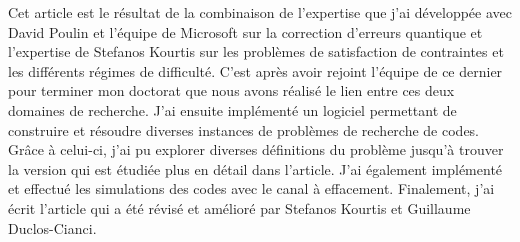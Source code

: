 Cet article est le résultat de la combinaison de l'expertise que j'ai développée avec David Poulin
et l'équipe de Microsoft sur la correction d'erreurs quantique et l'expertise de Stefanos Kourtis
sur les problèmes de satisfaction de contraintes et les différents régimes de difficulté.
C'est après avoir rejoint l'équipe de ce dernier pour terminer mon doctorat que nous avons 
réalisé le lien entre ces deux domaines de recherche.
J'ai ensuite implémenté un logiciel permettant de construire et résoudre diverses instances 
de problèmes de recherche de codes.
Grâce à celui-ci,
j'ai pu explorer diverses définitions du problème jusqu'à trouver la version qui est étudiée plus
en détail dans l'article.
J'ai également implémenté et effectué les simulations des codes avec le canal à effacement.
Finalement, 
j'ai écrit l'article qui a été révisé et amélioré par Stefanos Kourtis et Guillaume Duclos-Cianci.


